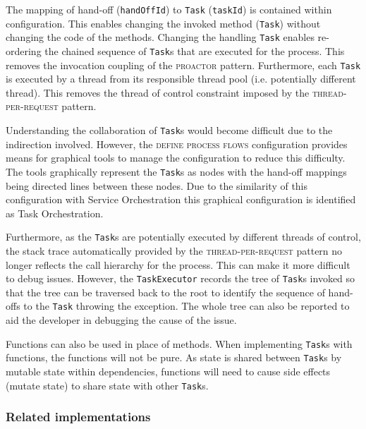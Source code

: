 \documentclass[prodmode]{style/acmlarge}
\begin{document}
The mapping of hand-off (\texttt{handOffId}) to \texttt{Task} (\texttt{taskId})
is contained within configuration.  This enables changing the invoked method
(\texttt{Task}) without changing the code of the methods.  Changing the handling
\texttt{Task} enables re-ordering the chained sequence of \texttt{Task}s that
are executed for the process.  This removes the invocation coupling of the
\textsc{proactor} pattern.  Furthermore, each \texttt{Task} is executed by a
thread from its responsible thread pool (i.e. potentially different thread). 
This removes the thread of control constraint imposed by the
\textsc{thread-per-request} pattern.

Understanding the collaboration of \texttt{Task}s would become difficult due to
the indirection involved.  However, the \textsc{define process flows}
configuration provides means for graphical tools to manage the configuration to
reduce this difficulty.  The tools graphically represent the \texttt{Task}s as
nodes with the hand-off mappings being directed lines between these nodes.  Due
to the similarity of this configuration with Service Orchestration this
graphical configuration is identified as Task Orchestration.

Furthermore, as the \texttt{Task}s are potentially executed by different threads
of control, the stack trace automatically provided by the
\textsc{thread-per-request} pattern no longer reflects the call hierarchy for
the process.  This can make it more difficult to debug issues.  However, the
\texttt{TaskExecutor} records the tree of \texttt{Task}s invoked so that the
tree can be traversed back to the root to identify the sequence of hand-offs to
the \texttt{Task} throwing the exception.  The whole tree can also be reported
to aid the developer in debugging the cause of the issue.

Functions can also be used in place of methods.  When implementing
\texttt{Task}s with functions, the functions will not be pure.  As state is
shared between \texttt{Task}s by mutable state within dependencies, functions
will need to cause side effects (mutate state) to share state with other
\texttt{Task}s.



\subsubsection*{Related implementations}
\end{document}

